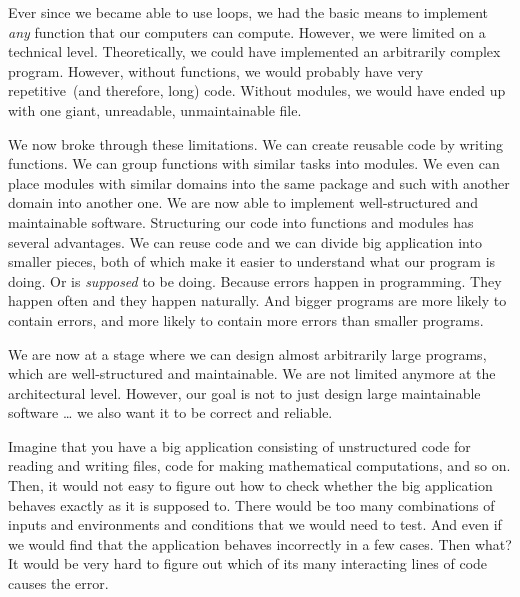 Ever since we became able to use  loops, we had the basic means to implement \emph{any} function that our computers can compute.
However, we were limited on a technical level.
Theoretically, we could have implemented an arbitrarily complex program.
However, without functions, we would probably have very repetitive~(and therefore, long) code.
Without modules, we would have ended up with one giant, unreadable, unmaintainable file.

We now broke through these limitations.
We can create reusable code by writing functions.
We can group functions with similar tasks into modules.
We even can place modules with similar domains into the same package and such with another domain into another one.
We are now able to implement well-structured and maintainable software.%
%
\FloatBarrier%
\endhsection%
%
%
\label{sec:unitTesting}%
%
%
%
Structuring our code into functions and modules has several advantages.
We can reuse code and we can divide big application into smaller pieces, both of which make it easier to understand what our program is doing.
Or is \emph{supposed} to be doing.
Because errors happen in programming.
They happen often and they happen naturally.
And bigger programs are more likely to contain errors, and more likely to contain more errors than smaller programs.

We are now at a stage where we can design almost arbitrarily large programs, which are well-structured and maintainable.
We are not limited anymore at the architectural level.
However, our goal is not to just design large maintainable software {\dots} we also want it to be correct and reliable.

Imagine that you have a big application consisting of unstructured code for reading and writing files, code for making mathematical computations, and so on.
Then, it would not easy to figure out how to check whether the big application behaves exactly as it is supposed to.
There would be too many combinations of inputs and environments and conditions that we would need to test.
And even if we would find that the application behaves incorrectly in a few cases.
Then what?
It would be very hard to figure out which of its many interacting lines of code causes the error.

